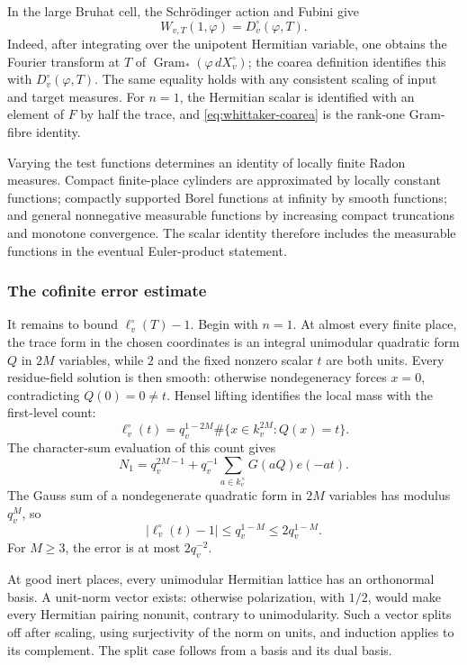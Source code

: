 In the large Bruhat cell, the Schrödinger action and Fubini give
\begin{equation}\label{eq:whittaker-coarea}
 W_{v,T}(1,\varphi)=D_v^\circ(\varphi,T).
\end{equation}
Indeed, after integrating over the unipotent Hermitian variable, one obtains the Fourier transform at $T$ of $\operatorname{Gram}_*(\varphi\,dX_v^\circ)$; the coarea definition identifies this with $D_v^\circ(\varphi,T)$. The same equality holds with any consistent scaling of input and target measures. For $n=1$, the Hermitian scalar is identified with an element of $F$ by half the trace, and \eqref{eq:whittaker-coarea} is the rank-one Gram-fibre identity.

Varying the test functions determines an identity of locally finite Radon measures. Compact finite-place cylinders are approximated by locally constant functions; compactly supported Borel functions at infinity by smooth functions; and general nonnegative measurable functions by increasing compact truncations and monotone convergence. The scalar identity therefore includes the measurable functions in the eventual Euler-product statement.

\subsubsection{The cofinite error estimate}

It remains to bound $\ell_v^\circ(T)-1$. Begin with $n=1$. At almost every finite place, the trace form in the chosen coordinates is an integral unimodular quadratic form $Q$ in $2M$ variables, while $2$ and the fixed nonzero scalar $t$ are both units. Every residue-field solution is then smooth: otherwise nondegeneracy forces $x=0$, contradicting $Q(0)=0\ne t$. Hensel lifting identifies the local mass with the first-level count:
\[
 \ell_v^\circ(t)=q_v^{1-2M}\#\{x\in k_v^{2M}:Q(x)=t\}.
\]
The character-sum evaluation of this count gives
\[
 N_1=q_v^{2M-1}+q_v^{-1}\sum_{a\in k_v^\times}G(aQ)e(-at).
\]
The Gauss sum of a nondegenerate quadratic form in $2M$ variables has modulus $q_v^M$, so
\[
 |\ell_v^\circ(t)-1|\le q_v^{1-M}\le2q_v^{1-M}.
\]
For $M\ge3$, the error is at most $2q_v^{-2}$.

At good inert places, every unimodular Hermitian lattice has an orthonormal basis. A unit-norm vector exists: otherwise polarization, with $1/2$, would make every Hermitian pairing nonunit, contrary to unimodularity. Such a vector splits off after scaling, using surjectivity of the norm on units, and induction applies to its complement. The split case follows from a basis and its dual basis.

